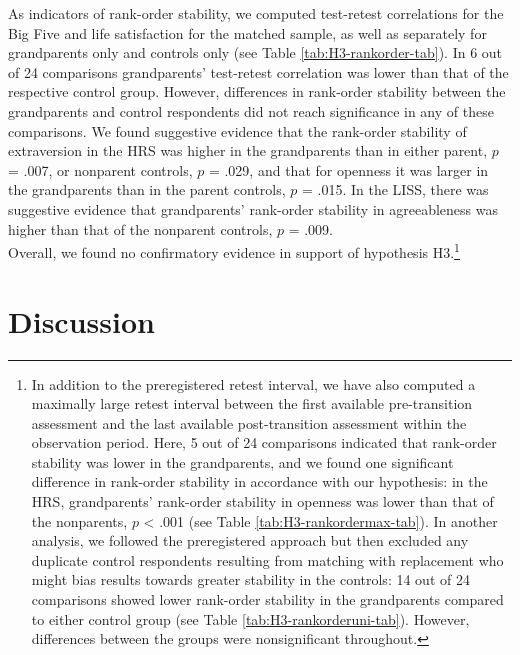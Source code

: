 \documentclass[
  english,
  man, noextraspace]{apa7}
\begin{document}
As indicators of rank-order stability, we computed test-retest correlations for the Big Five and life satisfaction for the matched sample, as well as separately for grandparents only and controls only (see Table \ref{tab:H3-rankorder-tab}). In 6 out of 24 comparisons grandparents' test-retest correlation was lower than that of the respective control group. However, differences in rank-order stability between the grandparents and control respondents did not reach significance in any of these comparisons. We found suggestive evidence that the rank-order stability of extraversion in the HRS was higher in the grandparents than in either parent, \(p\) = .007, or nonparent controls, \(p\) = .029, and that for openness it was larger in the grandparents than in the parent controls, \(p\) = .015. In the LISS, there was suggestive evidence that grandparents' rank-order stability in agreeableness was higher than that of the nonparent controls, \(p\) = .009.\\
Overall, we found no confirmatory evidence in support of hypothesis H3.\footnote{In addition to the preregistered retest interval, we have also computed a maximally large retest interval between the first available pre-transition assessment and the last available post-transition assessment within the observation period. Here, 5 out of 24 comparisons indicated that rank-order stability was lower in the grandparents, and we found one significant difference in rank-order stability in accordance with our hypothesis: in the HRS, grandparents' rank-order stability in openness was lower than that of the nonparents, \(p\) \textless{} .001 (see Table \ref{tab:H3-rankordermax-tab}). In another analysis, we followed the preregistered approach but then excluded any duplicate control respondents resulting from matching with replacement who might bias results towards greater stability in the controls: 14 out of 24 comparisons showed lower rank-order stability in the grandparents compared to either control group (see Table \ref{tab:H3-rankorderuni-tab}). However, differences between the groups were nonsignificant throughout.}

\hypertarget{discussion}{%
\section{Discussion}\label{discussion}}
\end{document}
